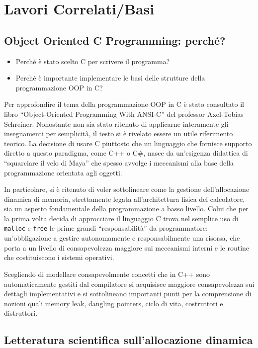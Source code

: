 \chapter{Lavori Correlati/Basi}
\section{Object Oriented C Programming: perché?}

\begin{itemize}
  \item Perché è stato scelto C per scrivere il programma?
  \item Perché è importante implementare le basi delle strutture della programmazione OOP in C?
\end{itemize}

Per approfondire il tema della programmazione OOP in C è stato consultato il libro ``Object-Oriented Programming With ANSI-C'' del professor Axel-Tobias Schreiner. Nonostante non sia stato ritenuto di applicarne interamente gli insegnamenti per semplicità, il testo si è rivelato essere un utile riferimento teorico. La decisione di usare C piuttosto che un linguaggio che fornisce supporto diretto a questo paradigma, come C++ o C\#, nasce da un’esigenza didattica di ``squarciare il velo di Maya'' che spesso avvolge i meccanismi alla base della programmazione orientata agli oggetti.

In particolare, si è ritenuto di voler sottolineare come la gestione dell’allocazione dinamica di memoria, strettamente legata all’architettura fisica del calcolatore, sia un aspetto fondamentale della programmazione a basso livello. Colui che per la prima volta decida di approcciare il linguaggio C trova nel semplice uso di \texttt{malloc} e \texttt{free} le prime grandi ``responsabilità'' da programmatore: un’obbligazione a gestire autonomamente e responsabilmente una risorsa, che porta a un livello di consapevolezza maggiore sui meccanismi interni e le routine che costituiscono i sistemi operativi.

Scegliendo di modellare consapevolmente concetti che in C++ sono automaticamente gestiti dal compilatore si acquisisce maggiore consapevolezza sui dettagli implementativi e si sottolineano importanti punti per la comprensione di nozioni quali memory leak, dangling pointers, ciclo di vita, costruttori e distruttori.

\section{Letteratura scientifica sull’allocazione dinamica}

